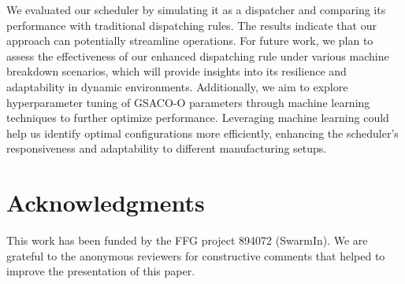 \documentclass[runningheads]{llncs}
\begin{document}
We evaluated our scheduler by simulating it as a dispatcher and comparing its performance with traditional dispatching rules. The results indicate that our approach can potentially streamline operations. For future work, we plan to assess the effectiveness of our enhanced dispatching rule under various machine breakdown scenarios, which will provide insights into its resilience and adaptability in dynamic environments.
Additionally, we aim to explore hyperparameter tuning of GSACO-O parameters through machine learning techniques to further optimize performance. Leveraging machine learning could help us identify optimal configurations more efficiently, enhancing the scheduler's responsiveness and adaptability to different manufacturing setups.

\section*{Acknowledgments}
This work has been funded by the FFG project 894072 (SwarmIn).
We are grateful to the anonymous reviewers for constructive 
comments that helped to improve the presentation of this paper.




%
%
%
% 
% 
%

\end{document}
